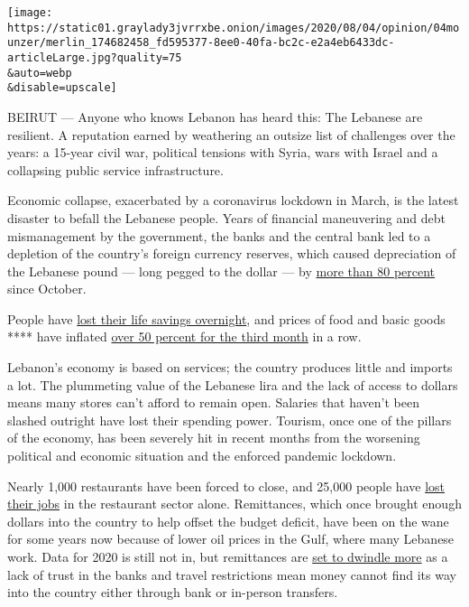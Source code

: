 \texttt{[image: https://static01.graylady3jvrrxbe.onion/images/2020/08/04/opinion/04mounzer/merlin\_174682458\_fd595377-8ee0-40fa-bc2c-e2a4eb6433dc-articleLarge.jpg?quality=75\\\&auto=webp\\\&disable=upscale]}

BEIRUT --- Anyone who knows Lebanon has heard this: The Lebanese are
resilient. A reputation earned by weathering an outsize list of
challenges over the years: a 15-year civil war, political tensions with
Syria, wars with Israel and a collapsing public service infrastructure.

Economic collapse, exacerbated by a coronavirus lockdown in March, is
the latest disaster to befall the Lebanese people. Years of financial
maneuvering and debt mismanagement by the government, the banks and the
central bank led to a depletion of the country's foreign currency
reserves, which caused depreciation of the Lebanese pound --- long
pegged to the dollar --- by
\href{https://www.forbes.com/sites/tatianakoffman/2020/07/09/lebanons-currency-crisis-paves-the-way-to-a-new-future/\#5ae751526a17}{more
than 80 percent} since October.

People have
\href{https://en.annahar.com/article/1187657-lebanons-banking-crisis-risks-wiping-life-savings-of-thousands}{lost
their life savings overnight}, and prices of food and basic goods ****
have inflated
\href{https://www.reuters.com/article/us-emerging-inflation-graphic/lebanon-follows-venezuela-into-hyperinflation-wilderness-idUSKCN24O20J}{over
50 percent for the third month} in a row.

Lebanon's economy is based on services; the country produces little and
imports a lot. The plummeting value of the Lebanese lira and the lack of
access to dollars means many stores can't afford to remain open.
Salaries that haven't been slashed outright have lost their spending
power. Tourism, once one of the pillars of the economy, has been
severely hit in recent months from the worsening political and economic
situation and the enforced pandemic lockdown.

Nearly 1,000 restaurants have been forced to close, and 25,000 people
have
\href{https://www.aljazeera.com/ajimpact/lebanons-restaurants-sinking-coronavirus-lockdown-200506095822226.html}{lost
their jobs} in the restaurant sector alone. Remittances, which once
brought enough dollars into the country to help offset the budget
deficit, have been on the wane for some years now because of lower oil
prices in the Gulf, where many Lebanese work. Data for 2020 is still not
in, but remittances are
\href{https://www.middleeasteye.net/news/coronavirus-egypt-lebanon-jordan-remittance-economy}{set
to dwindle more} as a lack of trust in the banks and travel restrictions
mean money cannot find its way into the country either through bank or
in-person transfers.

